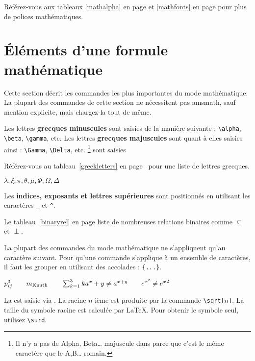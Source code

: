 Référez-vous aux tableaux \ref{mathalpha} en page \pageref{mathalpha}
et \ref{mathfonts} en page \pageref{mathfonts} pour plus de polices
mathématiques.


\section{Éléments d'une formule mathématique}


Cette section décrit les commandes les plus importantes 
du mode mathématique. La plupart des commandes de cette section ne
nécessitent pas \textsf{amsmath}, sauf mention explicite, mais
chargez-la tout de même.


Les lettres \textbf{grecques minuscules} sont saisies de la manière
suivante :
\verb|\alpha|, \verb|\beta|, \verb|\gamma|, etc. Les lettres
\textbf{grecques majuscules} sont quant à elles saisies ainsi :
\verb|\Gamma|, \verb|\Delta|, etc.
\footnote{Il n'y a pas de Alpha, Beta\ldots{} majuscule dans \LaTeXe{}
parce que c'est le même caractère que le A,B\ldots{} romain.} sont saisies

Référez-vous au tableau~\ref{greekletters} en
page~\pageref{greekletters} pour une liste de lettres grecques.
\begin{example}
$\lambda,\xi,\pi,\theta,
 \mu,\Phi,\Omega,\Delta$
\end{example}
 

Les \textbf{indices, exposants et lettres supérieures}
sont
positionnés en utilisant les caractères
\verb|_| et \verb|^|.

Le tableau~\ref{binaryrel} en page \pageref{binaryrel}  liste de
nombreuses relations binaires comme $\subseteq$ et $\perp$.

La plupart des commandes du mode mathématique ne s'appliquent qu'au
caractère suivant. Pour qu'une commande s'applique à un ensemble de
caractères, il faut les grouper en utilisant des accolades :
\verb|{...}|. 

\begin{example}
$p^3_{ij} \qquad 
 m_\text{Knuth}\qquad
\sum_{k=1}^3 k \\[5pt]
 a^x+y \neq a^{x+y}\qquad 
 e^{x^2} \neq {e^x}^2$
\end{example}

La \textbf{} est saisie via . La
racine $n$-ième est produite par la commande
\verb|\sqrt[|$n$\verb|]|. La taille du symbole racine est calculée par
\LaTeX. Pour obtenir le symbole seul, utilisez \verb|\surd|.

